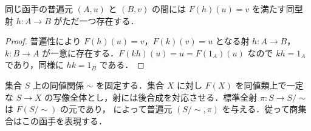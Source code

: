 \begin{prop}[普遍元の一意性]
同じ函手の普遍元 $(A,u)$ と $(B,v)$ の間には $F(h)(u)=v$ を満たす同型射 $h:A\to B$ がただ一つ存在する．
\end{prop}
\begin{proof}
普遍性により $F(h)(u)=v$，$F(k)(v)=u$ となる射 $h:A\to B$，$k:B\to A$ が一意に存在する．$F(kh)(u)=u=F(1_A)(u)$ なので $kh=1_A$ であり，同様に $hk=1_B$ である．
\end{proof}
\begin{prop}[商集合の普遍元]
集合 $S$ 上の同値関係 $\sim$ を固定する．集合 $X$ に対し $F(X)$ を同値類上で一定な $S\to X$ の写像全体とし，射には後合成を対応させる．標準全射 $\pi:S\to S/{\sim}$ は $F(S/{\sim})$ の元であり， によって普遍元 $(S/{\sim},\pi)$ を与える．従って商集合はこの函手を表現する．
\end{prop}
